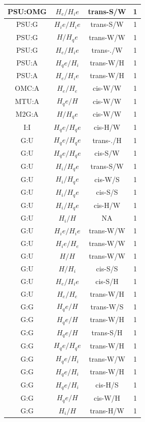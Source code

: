 \begin{center}
\begin{longtable}{c|c|c|c}
PSU:OMG & $H_e/H_ie$ & trans-S/W & 1 \\  \hline
PSU:G & $H_ie/H_ie$ & trans-S/W & 1 \\  \hline
PSU:G & $H/H_qe$ & trans-W/W & 1 \\  \hline
PSU:G & $H_e/H_ie$ & trans-./W & 1 \\  \hline
PSU:A & $H_qe/H_i$ & trans-W/H & 1 \\  \hline
PSU:A & $H_e/H_ie$ & trans-W/H & 1 \\  \hline
OMC:A & $H_e/H_e$ & cis-W/W & 1 \\  \hline
MTU:A & $H_qe/H$ & cis-W/W & 1 \\  \hline
M2G:A & $H/H_qe$ & cis-W/W & 1 \\  \hline
I:I & $H_qe/H_qe$ & cis-H/W & 1 \\  \hline
G:U & $H_qe/H_qe$ & trans-./H & 1 \\  \hline
G:U & $H_qe/H_qe$ & cis-S/W & 1 \\  \hline
G:U & $H_i/H_qe$ & trans-S/W & 1 \\  \hline
G:U & $H_i/H_qe$ & cis-W/S & 1 \\  \hline
G:U & $H_i/H_qe$ & cis-S/S & 1 \\  \hline
G:U & $H_i/H_qe$ & cis-H/W & 1 \\  \hline
G:U & $H_i/H$ & NA & 1 \\  \hline
G:U & $H_ie/H_ie$ & trans-W/W & 1 \\  \hline
G:U & $H_ie/H_e$ & trans-W/W & 1 \\  \hline
G:U & $H/H$ & trans-W/W & 1 \\  \hline
G:U & $H/H_i$ & cis-S/S & 1 \\  \hline
G:U & $H_e/H_ie$ & cis-S/H & 1 \\  \hline
G:U & $H_e/H_e$ & trans-W/H & 1 \\  \hline
G:G & $H_qe/H$ & trans-W/S & 1 \\  \hline
G:G & $H_qe/H$ & trans-W/H & 1 \\  \hline
G:G & $H_qe/H$ & trans-S/H & 1 \\  \hline
G:G & $H_qe/H_qe$ & trans-W/H & 1 \\  \hline
G:G & $H_qe/H_i$ & trans-W/W & 1 \\  \hline
G:G & $H_qe/H_i$ & trans-W/H & 1 \\  \hline
G:G & $H_qe/H_i$ & cis-H/S & 1 \\  \hline
G:G & $H_qe/H$ & cis-W/H & 1 \\  \hline
G:G & $H_i/H$ & trans-H/W & 1 \\  \hline

\end{longtable}
\end{center}
